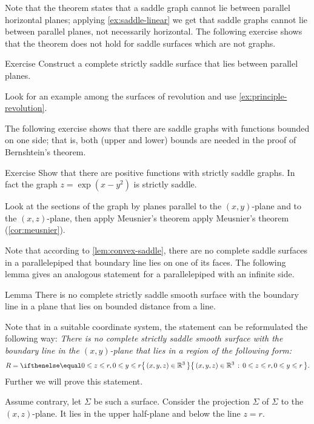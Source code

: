 Note that the theorem states that a saddle graph cannot lie between parallel horizontal planes;
applying \ref{ex:saddle-linear} we get that saddle graphs cannot lie between parallel planes,
not necessarily horizontal.
The following exercise shows that the theorem does not hold for saddle surfaces which are not graphs.


\begin{thm}{Exercise}\label{ex:between-parallels}
Construct a complete strictly saddle surface that lies between parallel planes.
\end{thm}

 Look for an example among the surfaces of revolution and use \ref{ex:principle-revolution}.


The following exercise shows that there are saddle graphs with functions bounded on one side; that is, both (upper and lower) bounds are needed in the proof of Bernshtein's theorem.

\begin{thm}{Exercise}\label{ex:one-side-bernshtein}
Show that there are positive functions with strictly saddle graphs.
In fact the graph
$z=\exp(x-y^2)$
is strictly saddle.
\end{thm}

 Look at the sections of the graph by planes parallel to the $(x,y)$-plane and to the $(x,z)$-plane, then apply Meusnier’s theorem apply Meusnier's theorem (\ref{cor:meusnier}).

Note that according to \ref{lem:convex-saddle}, there are no complete saddle surfaces in a parallelepiped that boundary line lies on one of its faces.
The following lemma gives an analogous statement for a parallelepiped with an infinite side.

\begin{thm}{Lemma}\label{lem:region}
There is no complete strictly saddle smooth surface 
with the boundary line in a plane
that lies on bounded distance from a line.
\end{thm}


Note that in a suitable coordinate system, the statement can be reformulated the following way:
\emph{There is no complete strictly saddle smooth surface 
with the boundary line in the $(x,y)$-plane
that lies in a region of the following form:}
\[R=\set{(x,y,z)\in\RR^3}{0\le z\le r, 0\le y\le r}.\]
Further we will prove this statement.

Assume contrary, let $\Sigma$ be such a surface.
Consider the projection $\hat \Sigma$ of $\Sigma$ to the $(x,z)$-plane.
It lies in the upper half-plane and below the line $z=r$.

